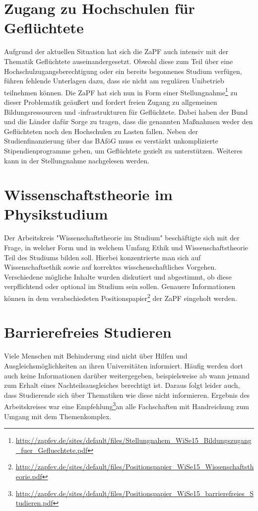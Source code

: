 \section*{Zugang zu Hochschulen für Geflüchtete}
Aufgrund der aktuellen Situation hat sich die ZaPF auch intensiv mit der Thematik \glqq{}Geflüchtete\grqq{} auseinandergesetzt. Obwohl diese zum Teil über eine Hochschulzugangsberechtigung oder ein bereits begonnenes Studium verfügen, führen fehlende Unterlagen dazu, dass sie nicht am regulären Unibetrieb teilnehmen können. Die ZaPF hat sich nun in Form einer Stellungnahme\footnote{\href{http://zapfev.de/sites/default/files/Stellungnahem\_WiSe15\_Bildungszugang\_fuer\_Gefluechtete.pdf}{\url{http://zapfev.de/sites/default/files/Stellungnahem\_WiSe15\_Bildungszugang\_fuer\_Gefluechtete.pdf}}} zu dieser Problematik geäußert und fordert freien Zugang zu allgemeinen Bildungsressourcen und -infrastrukturen für Geflüchtete. Dabei haben der Bund und die Länder dafür Sorge zu tragen, dass die genannten Maßnahmen weder den Geflüchteten noch den Hochschulen zu Lasten fallen. Neben der Studienfinanzierung über das BAföG muss es verstärkt unkomplizierte Stipendienprogramme geben, um Geflüchtete gezielt zu unterstützen. Weiteres kann in der Stellungnahme nachgelesen werden.

\section*{Wissenschaftstheorie im Physikstudium}
Der  Arbeitskreis "Wissenschaftstheorie im Studium" beschäftigte sich mit der Frage, in welcher Form und in welchem Umfang Ethik und Wissenschaftstheorie Teil des Studiums bilden soll. Hierbei konzentrierte man sich auf Wissenschaftsethik sowie auf korrektes wisschenschaftliches Vorgehen. Verschiedene mögliche Inhalte wurden diskutiert und abgestimmt, ob diese verpflichtend oder optional im Studium sein sollen. Genauere Informationen können in dem verabschiedeten Positionspapier\footnote{\href{http://zapfev.de/sites/default/files/Positionspapier\_WiSe15\_Wissenschaftstheorie.pdf}{\url{http://zapfev.de/sites/default/files/Positionspapier\_WiSe15\_Wissenschaftstheorie.pdf}}} der ZaPF eingeholt werden.

\section*{Barrierefreies Studieren}
Viele Menschen mit Behinderung sind nicht über Hilfen und Ausgleichsmöglichkeiten an ihren Universitäten informiert. Häufig werden dort auch keine Informationen darüber weitergegeben, beispielsweise ab wann jemand zum Erhalt eines Nachteilsausgleiches berechtigt ist. Daraus folgt leider auch, dass Studierende sich über Thematiken wie diese nicht informieren.
Ergebnis des Arbeitskreises war eine Empfehlung\footnote{\href{http://zapfev.de/sites/default/files/Positionspapier\_WiSe15\_barrierefreies\_Studieren.pdf}{\url{http://zapfev.de/sites/default/files/Positionspapier\_WiSe15\_barrierefreies\_Studieren.pdf}}}an alle Fachschaften mit Handreichung zum Umgang mit dem Themenkomplex.

